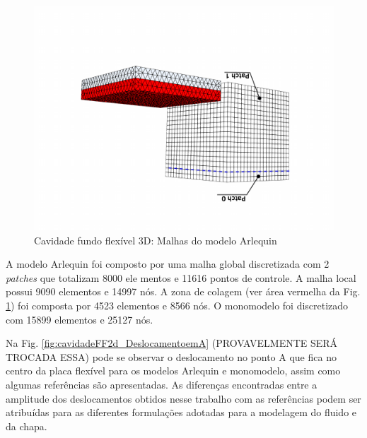 \documentclass[tese_patricia]{subfiles}
\begin{document}
\begin{figure}[htb!]
	\centering 
	\includegraphics[angle=180, scale=0.5,trim=0cm 1cm 2cm 6cm, clip=true]{Imagens/Cap7/cavidade3Dmesh.pdf}	
	\caption{Cavidade fundo flexível 3D: Malhas do modelo Arlequin}
	\label{fig:cavidadeFF2d_MalhaArlequin}
\end{figure}

A modelo Arlequin foi composto por uma malha global discretizada com 2 \textit{patches} que totalizam 8000 ele mentos e 11616 pontos de controle. A malha local possui 9090 elementos e 14997 nós. A zona de colagem (ver área vermelha da Fig. \ref {fig:cavidadeFF2d_MalhaArlequin}) foi composta por 4523 elementos e 8566 nós. O monomodelo foi discretizado com 15899 elementos e 25127 nós.

Na Fig. \ref{fig:cavidadeFF2d_DeslocamentoemA} (PROVAVELMENTE SERÁ TROCADA ESSA) pode se observar o deslocamento no ponto A que fica no centro da placa flexível para os modelos Arlequin e monomodelo, assim como algumas referências são apresentadas. As diferenças encontradas entre a amplitude dos deslocamentos obtidos nesse trabalho com as referências podem ser atribuídas para as diferentes formulações adotadas para a modelagem do fluido e da chapa.
\end{document}
